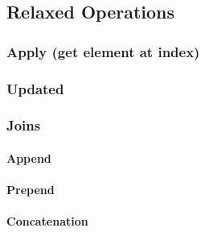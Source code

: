 \subsection{Relaxed Operations}


\subsubsection{Apply (get element at index)}



\subsubsection{Updated}


\subsubsection{Joins}

\paragraph{Append}

\paragraph{Prepend}


\paragraph{Concatenation}

